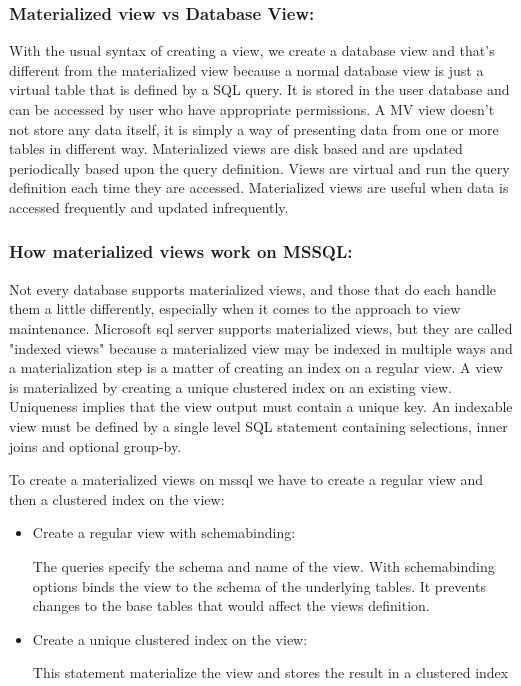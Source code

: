 \subsubsection{Materialized view vs Database View:} With the usual syntax of creating a view, we create a database view  and that's different from the materialized view because a normal database view is just a virtual table that is defined by a SQL query. It is stored in the user database and can be accessed by user who have appropriate permissions. A MV view doesn't not store any data itself, it is simply  a way of presenting data from one  or more tables in different way. Materialized views are disk based and are updated periodically based upon the query definition.\cite{Stackoverflow-author-08-2008} Views are virtual and run the query definition each time they are accessed. Materialized views are useful when data is accessed frequently and updated infrequently.

 \subsubsection{ How materialized views work on MSSQL:} Not every database supports materialized views, and those that do each handle them a little differently, especially when it comes to the approach to view maintenance.\cite{hattemer-2020} Microsoft sql server supports materialized views, but they are called "indexed views" because a materialized view may be indexed in multiple ways and a materialization step is a matter of creating an index on a regular view. A view is materialized by creating a unique clustered index on an existing view. Uniqueness implies that the view output must contain a unique key. An indexable view must be defined by a single level SQL statement containing selections, inner joins and optional group-by.\cite{goldstein-2001}\vspace{0.8cm}

 To create a materialized views on mssql we have to create a  regular view and then a clustered index on the view:
 \begin{itemize}
     \item {Create a regular view with schemabinding:}

The queries specify the schema and name of the view. With schemabinding options binds the view to the schema of the underlying tables. It prevents changes to the base tables that would affect the views definition.
      \item {Create a unique clustered index on the view:}

This statement materialize the view and stores the result in a clustered index
\end{itemize}




